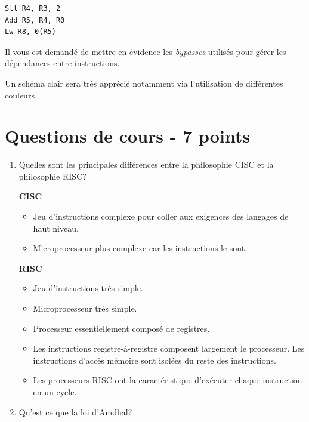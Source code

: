 {\begin{verbatim}
Sll R4, R3, 2
Add R5, R4, R0
Lw R8, 0(R5)
\end{verbatim}

Il vous est demand\'e de mettre en \'evidence les \textit{bypasses} utilis\'es
pour g\'erer les d\'ependances entre instructions.

Un sch\'ema clair sera tr\`es appr\'eci\'e notamment via l'utilisation
de diff\'erentes couleurs.

%
%

\section{Questions de cours - 7 points}

\begin{enumerate}
  \item
    Quelles sont les principales diff\'erences entre la philosophie CISC
    et la philosophie RISC?

    \begin{correction}

      \textbf{CISC}

      \begin{itemize}
	\item
	  Jeu d'instructions complexe pour coller aux exigences des
	  langages de haut niveau.
	\item
	  Microprocesseur plus complexe car les instructions le sont.
      \end{itemize}

      \textbf{RISC}

      \begin{itemize}
	\item
	  Jeu d'instructions tr\`es simple.
	\item
	  Microprocesseur tr\`es simple.
	\item
	  Processeur essentiellement compos\'e de registres.
	\item
	  Les instructions registre-\`a-registre composent largement le
	  processeur. Les instructions d'acc\`es m\'emoire sont isol\'ees du
	  reste des instructions.
	\item
	  Les processeurs RISC ont la caract\'eristique d'ex\'ecuter chaque
	  instruction en un cycle.
      \end{itemize}

    \end{correction}
  \item
    Qu'est ce que la loi d'Amdhal?


\end{enumerate}}
